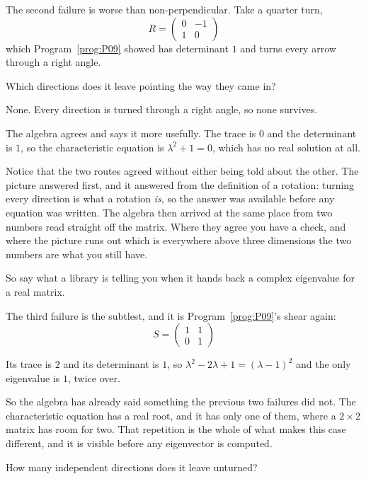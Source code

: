 \begin{fr}
The second failure is worse than non-perpendicular. Take a quarter turn,
\[ R = \begin{pmatrix} 0 & -1 \\ 1 & 0 \end{pmatrix} \]
which Program~\ref{prog:P09} showed has determinant $1$ and turns every arrow
through a right angle.

Which directions does it leave pointing the way they came in?
\dotline
\nextframe
\end{fr}

\begin{fr}
\begin{ansblock}
None. Every direction is turned through a right angle, so none survives.
\end{ansblock}

The algebra agrees and says it more usefully. The trace is $0$ and the
determinant is $1$, so the characteristic equation is $\lambda^{2} + 1 = 0$,
which has no real solution at all.

Notice that the two routes agreed without either being told about the other.
The picture answered first, and it answered from the definition of a rotation:
turning every direction is what a rotation \emph{is}, so the answer was
available before any equation was written. The algebra then arrived at the same
place from two numbers read straight off the matrix. Where they agree you have
a check, and where the picture runs out \dash{} which is everywhere above three
dimensions \dash{} the two numbers are what you still have.

So say what a library is telling you when it hands back a complex eigenvalue
for a real matrix.
\dotline
\nextframe
\end{fr}

\begin{fr}
The third failure is the subtlest, and it is Program~\ref{prog:P09}'s shear
again:
\[ S = \begin{pmatrix} 1 & 1 \\ 0 & 1 \end{pmatrix} \]

Its trace is $2$ and its determinant is $1$, so $\lambda^{2} - 2\lambda + 1 =
(\lambda - 1)^{2}$ and the only eigenvalue is $1$, twice over.

So the algebra has already said something the previous two failures did not.
The characteristic equation has a real root, and it has only one of them,
where a $2 \times 2$ matrix has room for two. That repetition is the whole of
what makes this case different, and it is visible before any eigenvector is
computed.

How many independent directions does it leave unturned?
\dotline
\nextframe
\end{fr}

